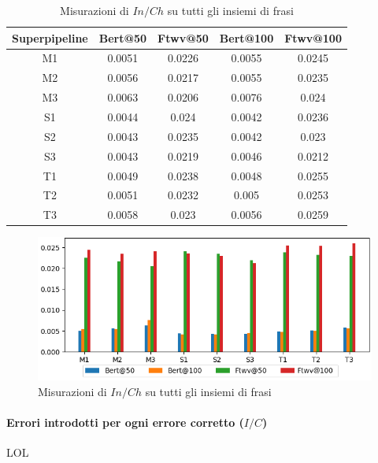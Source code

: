 \begin{table}[H]
\centering
\begin{tabular}{c|cc|cc}
\textbf{Superpipeline} & \textbf{Bert@50} &  \textbf{Ftwv@50} & \textbf{Bert@100} & \textbf{Ftwv@100}\\
\hline
M1& 0.0051& 0.0226& 0.0055& 0.0245\\
M2& 0.0056& 0.0217& 0.0055& 0.0235\\
M3& 0.0063& 0.0206& 0.0076& 0.024\\
S1& 0.0044& 0.024& 0.0042& 0.0236\\
S2& 0.0043& 0.0235& 0.0042& 0.023\\
S3& 0.0043& 0.0219& 0.0046& 0.0212\\
T1& 0.0049& 0.0238& 0.0048& 0.0255\\
T2& 0.0051& 0.0232& 0.005& 0.0253\\
T3& 0.0058& 0.023& 0.0056& 0.0259\\
\end{tabular}
\caption{Misurazioni di $In/Ch$ su tutti gli insiemi di frasi}
\label{fig:test_res_if_gra}
\end{table}

\begin{figure}[H]
\centering
\includegraphics[width=\textwidth]{immagini/test/if}
\caption{Misurazioni di $In/Ch$ su tutti gli insiemi di frasi}
\label{fig:test_res_if}
\end{figure}










\paragraph{Errori introdotti per ogni errore corretto ($I/C$)}
LOL

